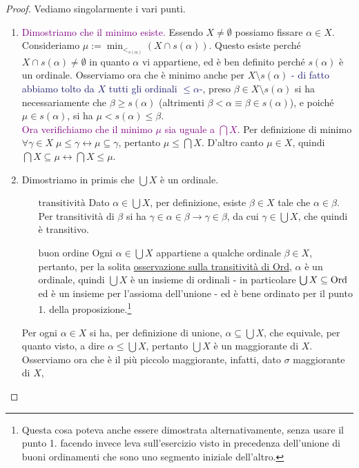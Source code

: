 \begin{proof}
	Vediamo singolarmente i vari punti.
	\begin{enumerate}[1.]
		\item \textcolor{purple}{Dimostriamo che il minimo esiste.} Essendo $X \ne \emptyset$ possiamo fissare $\alpha \in X$. Consideriamo $\mu := \min_{<_{s(\alpha)}}(X \cap s(\alpha))$.
		Questo esiste perché $X \cap s(\alpha) \ne \emptyset$ in quanto $\alpha$ vi appartiene, ed è ben definito perché $s(\alpha)$ è un ordinale. Osserviamo ora che è minimo anche per $X\setminus s(\alpha)$ \textcolor{MidnightBlue}{- di fatto abbiamo tolto da $X$ tutti gli ordinali $\leq \alpha$-},
		preso $\beta \in X \setminus s(\alpha)$ si ha necessariamente che $\beta \geq s(\alpha)$ (altrimenti $\beta < \alpha \equiv \beta \in s(\alpha)$), e poiché $\mu \in s(\alpha)$, si ha $\mu < s(\alpha) \leq \beta$.\\
		\textcolor{purple}{Ora verifichiamo che il minimo $\mu$ sia uguale a $\bigcap X$.} Per definizione di minimo $\forall \gamma \in X \; \mu \leq \gamma \leftrightarrow \mu \subseteq \gamma$, pertanto $\mu \leq \bigcap X$.
		D'altro canto $\mu \in X$, quindi $\bigcap X \subseteq \mu \leftrightarrow \bigcap X \leq \mu$.
		\item Dimostriamo in primis che $\bigcup X$ è un ordinale.
		\begin{itemize}
			\item[$\boxed{\text{transitività}}$] Dato $\alpha \in \bigcup X$, per definizione, esiste $\beta \in X$ tale che $\alpha \in \beta$. Per transitività di $\beta$ si ha $\gamma \in \alpha \in \beta \to \gamma \in \beta$, da cui $\gamma \in \bigcup X$, che quindi è transitivo.
			\item[$\boxed{\text{buon ordine}}$] Ogni $\alpha \in \bigcup X$ appartiene a qualche ordinale $\beta \in X$, pertanto, per la solita \hyperref[Ord_trans]{osservazione sulla transitività di Ord}, $\alpha$ è un ordinale, quindi $\bigcup X$ è un insieme di ordinali - in particolare $\bigcup X \subseteq \operatorname{Ord}$ ed è un insieme per l'assioma dell'unione - ed
			è bene ordinato per il punto 1. della proposizione.\footnote{Questa cosa poteva anche essere dimostrata alternativamente, senza usare il punto 1. facendo invece leva sull'esercizio visto in precedenza dell'unione di buoni ordinamenti che sono uno segmento iniziale dell'altro.}
		\end{itemize}
		Per ogni $\alpha \in X$ si ha, per definizione di unione, $\alpha \subseteq \bigcup X$, che equivale, per quanto visto, a dire $\alpha \leq \bigcup X$, pertanto $\bigcup X$ è un maggiorante di $X$. Osserviamo ora che è il più piccolo maggiorante, infatti, dato $\sigma$ maggiorante di $X$,

\end{enumerate}
\end{proof}
